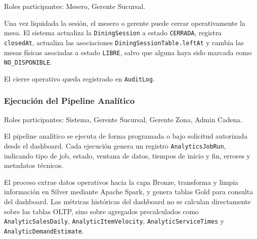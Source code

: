 Roles participantes: Mesero, Gerente Sucursal.

Una vez liquidada la sesión, el mesero o gerente puede cerrar operativamente la mesa.
El sistema actualiza la \texttt{DiningSession} a estado \texttt{CERRADA}, registra
\texttt{closedAt}, actualiza las asociaciones \texttt{DiningSessionTable.leftAt} y cambia
las mesas físicas asociadas a estado \texttt{LIBRE}, salvo que alguna haya sido marcada
como \texttt{NO\_DISPONIBLE}.

El cierre operativo queda registrado en \texttt{AuditLog}.

\subsubsection{Ejecución del Pipeline Analítico}

Roles participantes: Sistema, Gerente Sucursal, Gerente Zona, Admin Cadena.

El pipeline analítico se ejecuta de forma programada o bajo solicitud autorizada desde el
dashboard. Cada ejecución genera un registro \texttt{AnalyticsJobRun}, indicando tipo de
job, estado, ventana de datos, tiempos de inicio y fin, errores y metadatos técnicos.

El proceso extrae datos operativos hacia la capa Bronze, transforma y limpia información
en Silver mediante Apache Spark, y genera tablas Gold para consulta del dashboard. Las
métricas históricas del dashboard no se calculan directamente sobre las tablas OLTP, sino
sobre agregados precalculados como \texttt{AnalyticSalesDaily},
\texttt{AnalyticItemVelocity}, \texttt{AnalyticServiceTimes} y
\texttt{AnalyticDemandEstimate}.